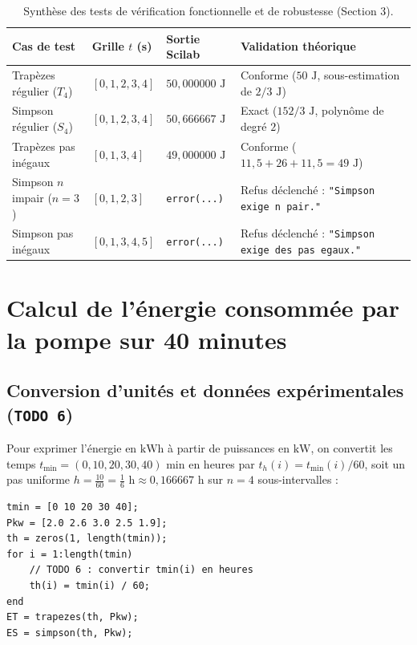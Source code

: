 \documentclass[10pt,a4paper]{article}
\begin{document}
\begin{table}[ht!]
\centering
\caption{Synthèse des tests de vérification fonctionnelle et de robustesse (Section 3).}
\label{tab:verif}
\begin{tabularx}{\textwidth}{@{}l l l >{\raggedright\arraybackslash}X@{}}
\toprule
\textbf{Cas de test} & \textbf{Grille $t$ (s)} & \textbf{Sortie Scilab} & \textbf{Validation théorique} \\
\midrule
Trapèzes régulier ($T_4$) & $[0, 1, 2, 3, 4]$ & $50,000000\text{ J}$ & Conforme ($50\text{ J}$, sous-estimation de $2/3\text{ J}$) \\
Simpson régulier ($S_4$) & $[0, 1, 2, 3, 4]$ & $50,666667\text{ J}$ & Exact ($152/3\text{ J}$, polynôme de degré $2$) \\
Trapèzes pas inégaux & $[0, 1, 3, 4]$ & $49,000000\text{ J}$ & Conforme ($11,5 + 26 + 11,5 = 49\text{ J}$) \\
Simpson $n$ impair ($n=3$) & $[0, 1, 2, 3]$ & \texttt{error(...)} & Refus déclenché : \texttt{"Simpson exige n pair."} \\
Simpson pas inégaux & $[0, 1, 3, 4, 5]$ & \texttt{error(...)} & Refus déclenché : \texttt{"Simpson exige des pas egaux."} \\
\bottomrule
\end{tabularx}
\end{table}

\section{Calcul de l'énergie consommée par la pompe sur 40 minutes}

\subsection{Conversion d'unités et données expérimentales (\texttt{TODO 6})}
Pour exprimer l'énergie en $\text{kWh}$ à partir de puissances en $\text{kW}$, on convertit les temps $t_{\min} = (0, 10, 20, 30, 40)\text{ min}$ en heures par $t_h(i) = t_{\min}(i)/60$, soit un pas uniforme $h = \frac{10}{60} = \frac{1}{6}\text{ h} \approx 0,166667\text{ h}$ sur $n = 4$ sous-intervalles :

\noindent\begin{minipage}{\textwidth}
\begin{lstlisting}[caption={Conversion en heures (\texttt{TODO 6}) et calcul des énergies de la pompe.}]
tmin = [0 10 20 30 40];
Pkw = [2.0 2.6 3.0 2.5 1.9];
th = zeros(1, length(tmin));
for i = 1:length(tmin)
    // TODO 6 : convertir tmin(i) en heures
    th(i) = tmin(i) / 60;
end
ET = trapezes(th, Pkw);
ES = simpson(th, Pkw);
\end{lstlisting}
\end{minipage}
\end{document}
